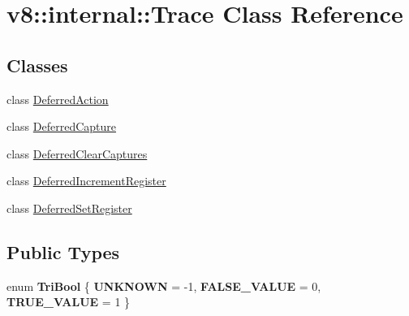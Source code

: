 \hypertarget{classv8_1_1internal_1_1Trace}{}\section{v8\+:\+:internal\+:\+:Trace Class Reference}
\label{classv8_1_1internal_1_1Trace}
\subsection*{Classes}
\begin{DoxyCompactItemize}
\item 
class \mbox{\hyperlink{classv8_1_1internal_1_1Trace_1_1DeferredAction}{Deferred\+Action}}
\item 
class \mbox{\hyperlink{classv8_1_1internal_1_1Trace_1_1DeferredCapture}{Deferred\+Capture}}
\item 
class \mbox{\hyperlink{classv8_1_1internal_1_1Trace_1_1DeferredClearCaptures}{Deferred\+Clear\+Captures}}
\item 
class \mbox{\hyperlink{classv8_1_1internal_1_1Trace_1_1DeferredIncrementRegister}{Deferred\+Increment\+Register}}
\item 
class \mbox{\hyperlink{classv8_1_1internal_1_1Trace_1_1DeferredSetRegister}{Deferred\+Set\+Register}}
\end{DoxyCompactItemize}
\subsection*{Public Types}
\begin{DoxyCompactItemize}
\item 
\mbox{\label{classv8_1_1internal_1_1Trace_a91598610521e048135cda64a1be64b99}} 
enum {\bfseries Tri\+Bool} \{ {\bfseries U\+N\+K\+N\+O\+WN} = -\/1, 
{\bfseries F\+A\+L\+S\+E\+\_\+\+V\+A\+L\+UE} = 0, 
{\bfseries T\+R\+U\+E\+\_\+\+V\+A\+L\+UE} = 1
 \}
\end{DoxyCompactItemize}

